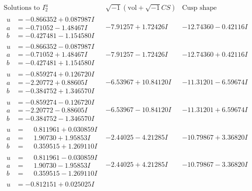 \documentclass[1p]{elsarticle_modified}
\theoremstyle{definition}
\newcommand{\I}{\sqrt{-1}}
\begin{document}
$$\begin{array}{c|c|c}  
\text{Solutions to }I^u_{2}& \I (\text{vol} + \sqrt{-1}CS) & \text{Cusp shape}\\
 \hline 
\begin{aligned}
u &= -0.866352 + 0.087987 I \\
a &= -0.71052 - 1.48467 I \\
b &= -0.427481 - 1.154580 I\end{aligned}
 & -7.91257 + 1.72426 I & -12.74360 - 0.42116 I \\ \hline\begin{aligned}
u &= -0.866352 - 0.087987 I \\
a &= -0.71052 + 1.48467 I \\
b &= -0.427481 + 1.154580 I\end{aligned}
 & -7.91257 - 1.72426 I & -12.74360 + 0.42116 I \\ \hline\begin{aligned}
u &= -0.859274 + 0.126720 I \\
a &= -2.20772 + 0.88605 I \\
b &= -0.384752 + 1.346570 I\end{aligned}
 & -6.53967 + 10.84120 I & -11.31201 - 6.59674 I \\ \hline\begin{aligned}
u &= -0.859274 - 0.126720 I \\
a &= -2.20772 - 0.88605 I \\
b &= -0.384752 - 1.346570 I\end{aligned}
 & -6.53967 - 10.84120 I & -11.31201 + 6.59674 I \\ \hline\begin{aligned}
u &= \phantom{-}0.811961 + 0.030859 I \\
a &= \phantom{-}1.90730 + 1.95853 I \\
b &= \phantom{-}0.359515 + 1.269110 I\end{aligned}
 & -2.44025 - 4.21285 I & -10.79867 + 3.36820 I \\ \hline\begin{aligned}
u &= \phantom{-}0.811961 - 0.030859 I \\
a &= \phantom{-}1.90730 - 1.95853 I \\
b &= \phantom{-}0.359515 - 1.269110 I\end{aligned}
 & -2.44025 + 4.21285 I & -10.79867 - 3.36820 I \\ \hline\begin{aligned}
u &= -0.812151 + 0.025025 I \\

\end{aligned}
\end{array}$$
\end{document}

